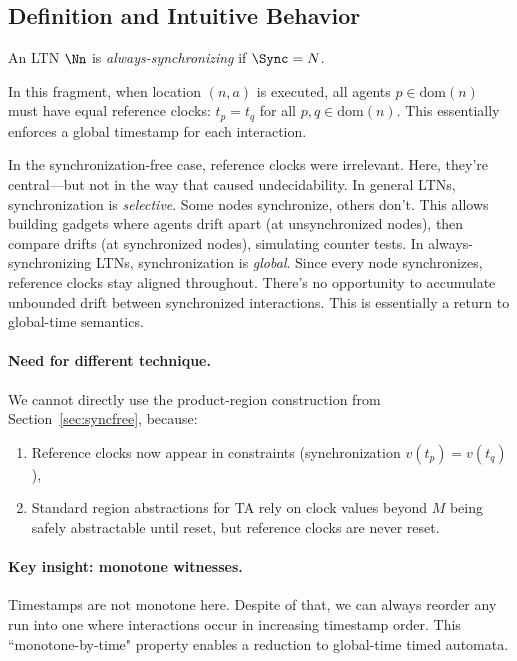 \subsection{Definition and Intuitive Behavior}

\begin{definition}
An LTN $\Nn$ is \emph{always-synchronizing} if $\Sync = N$.
\end{definition}

In this fragment, when location $(n, a)$ is executed, all agents $p \in \text{dom}(n)$ must have equal reference clocks: $t_p = t_q$ for all $p, q \in \text{dom}(n)$. This essentially enforces a global timestamp for each interaction.

In the synchronization-free case, reference clocks were irrelevant. Here, they're central—but not in the way that caused undecidability. In general LTNs, synchronization is \emph{selective}. Some nodes synchronize, others don't. This allows building gadgets where agents drift apart (at unsynchronized nodes), then compare drifts (at synchronized nodes), simulating counter tests.
In always-synchronizing LTNs, synchronization is \emph{global}. Since every node synchronizes, reference clocks stay aligned throughout. There's no opportunity to accumulate unbounded drift between synchronized interactions. This is essentially a return to global-time semantics.

\paragraph{Need for different technique.} We cannot directly use the product-region construction from Section~\ref{sec:syncfree}, because:
\begin{enumerate}
\item Reference clocks now appear in constraints (synchronization $v(t_p) = v(t_q)$),
\item Standard region abstractions for TA rely on clock values beyond $M$ being safely abstractable until reset, but reference clocks are never reset.
\end{enumerate}

\paragraph{Key insight: monotone witnesses.} Timestamps are not monotone here. Despite of that, we can always reorder any run into one where interactions occur in increasing timestamp order. This ``monotone-by-time" property enables a reduction to global-time timed automata.


